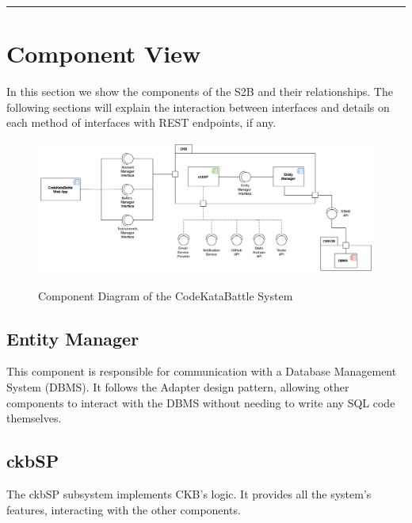 \documentclass{Configuration_Files/Template}
\begin{document}
{\color{bluepoli}\rule{\linewidth}{0.1pt}}

\section{Component View}

In this section we show the components of the S2B and their relationships. The following sections will explain the interaction between interfaces and details on each method of interfaces with REST endpoints, if any.

\begin{figure}[H]
\centering
\includegraphics[scale = 0.6]{Images/diagrams/Component_view.png}\\
\caption{Component Diagram of the CodeKataBattle System}
\end{figure}

\subsection{Entity Manager}

This component is responsible for communication with a Database Management System (DBMS). It follows the Adapter design pattern, allowing other components to interact with the DBMS without needing to write any SQL code themselves.

\subsection{ckbSP}

The ckbSP subsystem implements CKB's logic. It provides all the system's features, interacting with the other components.
\end{document}
